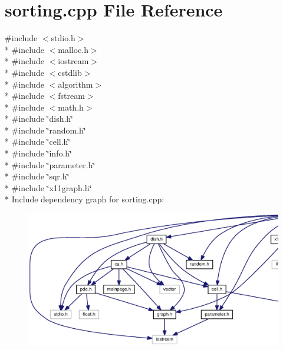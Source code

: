 \section{sorting.\-cpp File Reference}
\label{sorting_8cpp}
{\ttfamily \#include $<$stdio.\-h$>$}\\*
{\ttfamily \#include $<$malloc.\-h$>$}\\*
{\ttfamily \#include $<$iostream$>$}\\*
{\ttfamily \#include $<$cstdlib$>$}\\*
{\ttfamily \#include $<$algorithm$>$}\\*
{\ttfamily \#include $<$fstream$>$}\\*
{\ttfamily \#include $<$math.\-h$>$}\\*
{\ttfamily \#include \char`\"{}dish.\-h\char`\"{}}\\*
{\ttfamily \#include \char`\"{}random.\-h\char`\"{}}\\*
{\ttfamily \#include \char`\"{}cell.\-h\char`\"{}}\\*
{\ttfamily \#include \char`\"{}info.\-h\char`\"{}}\\*
{\ttfamily \#include \char`\"{}parameter.\-h\char`\"{}}\\*
{\ttfamily \#include \char`\"{}sqr.\-h\char`\"{}}\\*
{\ttfamily \#include \char`\"{}x11graph.\-h\char`\"{}}\\*
Include dependency graph for sorting.\-cpp\-:
\nopagebreak
\begin{figure}[H]
\begin{center}
\leavevmode
\includegraphics[width=350pt]{sorting_8cpp__incl}
\end{center}
\end{figure}
